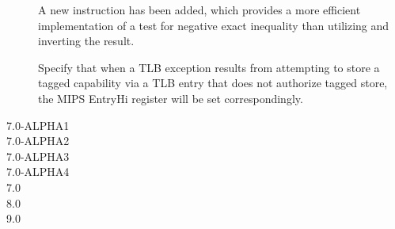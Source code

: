 \begin{description}
  A new  instruction has been added, which provides a
  more efficient implementation of a test for negative exact inequality than
  utilizing  and inverting the result.

  Specify that when a TLB exception results from attempting to store a
  tagged capability via a TLB entry that does not authorize tagged store, the
  MIPS EntryHi register will be set correspondingly.

\item[7.0-ALPHA1]


\item[7.0-ALPHA2]


\item[7.0-ALPHA3]


\item[7.0-ALPHA4]


\item[7.0]


\item[8.0]


\item[9.0]


\end{description}
